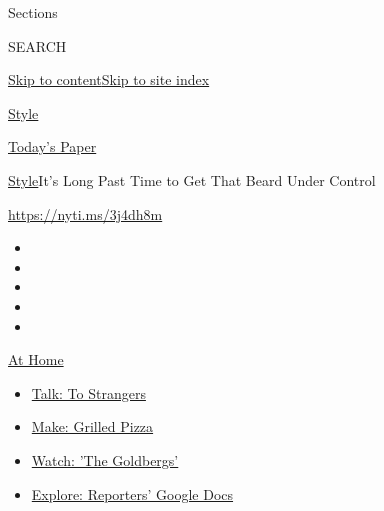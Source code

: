 Sections

SEARCH

\protect\hyperlink{site-content}{Skip to
content}\protect\hyperlink{site-index}{Skip to site index}

\href{https://www.nytimes3xbfgragh.onion/section/style}{Style}

\href{https://myaccount.nytimes3xbfgragh.onion/auth/login?response_type=cookie\&client_id=vi}{}

\href{https://www.nytimes3xbfgragh.onion/section/todayspaper}{Today's
Paper}

\href{/section/style}{Style}\textbar{}It's Long Past Time to Get That
Beard Under Control

\url{https://nyti.ms/3j4dh8m}

\begin{itemize}
\item
\item
\item
\item
\item
\end{itemize}

\href{https://www.nytimes3xbfgragh.onion/spotlight/at-home?action=click\&pgtype=Article\&state=default\&region=TOP_BANNER\&context=at_home_menu}{At
Home}

\begin{itemize}
\tightlist
\item
  \href{https://www.nytimes3xbfgragh.onion/2020/08/03/well/family/the-benefits-of-talking-to-strangers.html?action=click\&pgtype=Article\&state=default\&region=TOP_BANNER\&context=at_home_menu}{Talk:
  To Strangers}
\item
  \href{https://www.nytimes3xbfgragh.onion/2020/08/01/at-home/coronavirus-make-pizza-on-a-grill.html?action=click\&pgtype=Article\&state=default\&region=TOP_BANNER\&context=at_home_menu}{Make:
  Grilled Pizza}
\item
  \href{https://www.nytimes3xbfgragh.onion/2020/07/31/arts/television/goldbergs-abc-stream.html?action=click\&pgtype=Article\&state=default\&region=TOP_BANNER\&context=at_home_menu}{Watch:
  'The Goldbergs'}
\item
  \href{https://www.nytimes3xbfgragh.onion/interactive/2020/at-home/even-more-reporters-editors-diaries-lists-recommendations.html?action=click\&pgtype=Article\&state=default\&region=TOP_BANNER\&context=at_home_menu}{Explore:
  Reporters' Google Docs}
\end{itemize}

